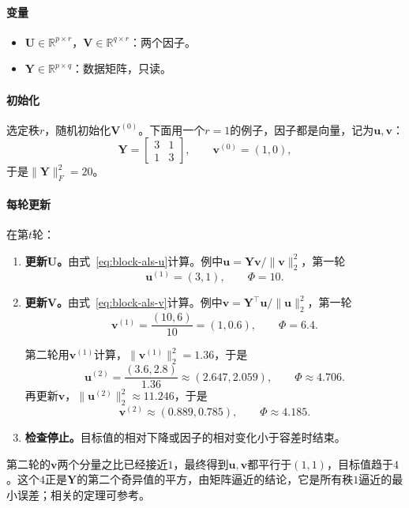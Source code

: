 \paragraph{变量}
\begin{itemize}
 \item $\bm{U}\in\mathbb{R}^{p\times r}$，$\bm{V}\in\mathbb{R}^{q\times r}$：两个因子。
 \item $\bm{Y}\in\mathbb{R}^{p\times q}$：数据矩阵，只读。
\end{itemize}

\paragraph{初始化}
选定秩$r$，随机初始化$\bm{V}^{(0)}$。下面用一个$r=1$的例子，因子都是向量，记为$\bm{u},\bm{v}$：
\[
 \bm{Y}=\begin{bmatrix}3&1\\1&3\end{bmatrix},\qquad \bm{v}^{(0)}=(1,0),
\]
于是$\lVert\bm{Y}\rVert_F^2=20$。

\paragraph{每轮更新}
在第$t$轮：
\begin{enumerate}
 \item \textbf{更新$\bm{U}$。}由式~\eqref{eq:block-als-u}计算。例中$\bm{u}=\bm{Y}\bm{v}/\lVert\bm{v}\rVert_2^2$，第一轮
 \[
  \bm{u}^{(1)}=(3,1),\qquad \Phi=10 .
 \]
 \item \textbf{更新$\bm{V}$。}由式~\eqref{eq:block-als-v}计算。例中$\bm{v}=\bm{Y}^\top\bm{u}/\lVert\bm{u}\rVert_2^2$，第一轮
 \[
  \bm{v}^{(1)}=\frac{(10,6)}{10}=(1,0.6),\qquad \Phi=6.4 .
 \]

 第二轮用$\bm{v}^{(1)}$计算，$\lVert\bm{v}^{(1)}\rVert_2^2=1.36$，于是
 \[
  \bm{u}^{(2)}=\frac{(3.6,2.8)}{1.36}\approx(2.647,2.059),\qquad \Phi\approx4.706 .
 \]
 再更新$\bm{v}$，$\lVert\bm{u}^{(2)}\rVert_2^2\approx11.246$，于是
 \[
  \bm{v}^{(2)}\approx(0.889,0.785),\qquad \Phi\approx4.185 .
 \]
 \item \textbf{检查停止。}目标值的相对下降或因子的相对变化小于容差时结束。
\end{enumerate}

第二轮的$\bm{v}$两个分量之比已经接近$1$，最终得到$\bm{u},\bm{v}$都平行于$(1,1)$，目标值趋于$4$。这个$4$正是$\bm{Y}$的第二个奇异值的平方，由矩阵逼近的结论，它是所有秩$1$逼近的最小误差；相关的定理可参考。

